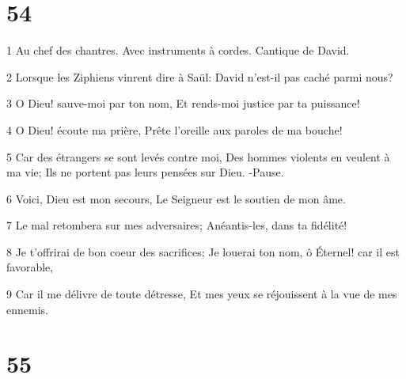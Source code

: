\chapter{54}

\par 1 Au chef des chantres. Avec instruments à cordes. Cantique de David.
\par 2 Lorsque les Ziphiens vinrent dire à Saül: David n'est-il pas caché parmi nous?
\par 3 O Dieu! sauve-moi par ton nom, Et rends-moi justice par ta puissance!
\par 4 O Dieu! écoute ma prière, Prête l'oreille aux paroles de ma bouche!
\par 5 Car des étrangers se sont levés contre moi, Des hommes violents en veulent à ma vie; Ils ne portent pas leurs pensées sur Dieu. -Pause.
\par 6 Voici, Dieu est mon secours, Le Seigneur est le soutien de mon âme.
\par 7 Le mal retombera sur mes adversaires; Anéantis-les, dans ta fidélité!
\par 8 Je t'offrirai de bon coeur des sacrifices; Je louerai ton nom, ô Éternel! car il est favorable,
\par 9 Car il me délivre de toute détresse, Et mes yeux se réjouissent à la vue de mes ennemis.

\chapter{55}

